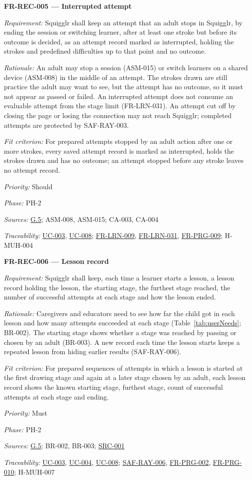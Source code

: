\documentclass[12pt]{article}
\renewcommand{\_}{\textunderscore\allowbreak}%
\newcommand{\goalref}[1]{\hyperref[goal:#1]{G.#1}}
\newcommand{\ucref}[1]{\hyperref[uc:#1]{\mbox{UC-#1}}}
\newenvironment{srsrequirement}[2]{%
  \par\medskip\noindent\phantomsection\label{req:#1}%
  \textbf{#1 --- #2}\par\nobreak\smallskip }{\par\medskip}
\newcommand{\reqfield}[2]{\noindent\textit{#1:} #2\par}
\newcommand{\reqshall}[1]{\reqfield{Requirement}{#1}}
\newcommand{\reqrationale}[1]{\reqfield{Rationale}{#1}}
\newcommand{\reqfit}[1]{\reqfield{Fit criterion}{#1}}
\newcommand{\reqpriority}[1]{\reqfield{Priority}{#1}}
\newcommand{\reqphase}[1]{\reqfield{Phase}{#1}}
\newcommand{\reqsources}[1]{\reqfield{Sources}{#1}}
\newcommand{\reqtraces}[1]{\reqfield{Traceability}{#1}}
\newcommand{\reqref}[1]{\hyperref[req:#1]{#1}}
\newcommand{\srcref}[1]{\hyperref[src:#1]{SRC-#1}}
\providecommand{\ucref}[1]{\hyperref[uc:#1]{UC-#1}}
\begin{document}
\begin{srsrequirement}{FR-REC-005}{Interrupted attempt}
  \reqshall{Squigglr shall keep an attempt that an adult stops in Squigglr, by
ending the session or switching learner, after at least one stroke but before
its outcome is decided, as an attempt record marked as interrupted, holding the
strokes and predefined difficulties up to that point and no outcome.}
\reqrationale{An adult may stop a session (ASM-015) or switch learners on a
shared device (ASM-008) in the middle of an attempt. The strokes drawn are still
practice the adult may want to see, but the attempt has no outcome, so it must
not appear as passed or failed. An interrupted attempt does not consume an
evaluable attempt from the stage limit (FR-LRN-031). An attempt cut off by
closing the page or losing the connection may not reach Squigglr; completed
attempts are protected by SAF-RAY-003.} \reqfit{For prepared attempts stopped by
an adult action after one or more strokes, every saved attempt record is marked
as interrupted, holds the strokes drawn and has no outcome; an attempt stopped
before any stroke leaves no attempt record.}
  \reqpriority{Should}
  \reqphase{PH-2}
  \reqsources{\goalref{5}; ASM-008, ASM-015; CA-003, CA-004}
  \reqtraces{\ucref{003}, \ucref{008}; \reqref{FR-LRN-009}, \reqref{FR-LRN-031}, \reqref{FR-PRG-009};
  H-MUH-004}
\end{srsrequirement}

\begin{srsrequirement}{FR-REC-006}{Lesson record}
  \reqshall{Squigglr shall keep, each time a learner starts a lesson, a lesson
record holding the lesson, the starting stage, the furthest stage reached, the
number of successful attempts at each stage and how the lesson ended.}
\reqrationale{Caregivers and educators need to see how far the child got in each
lesson and how many attempts succeeded at each stage (Table~\ref{tab:userNeeds};
BR-002). The starting stage shows whether a stage was reached by passing or
chosen by an adult (BR-003). A new record each time the lesson starts keeps a
repeated lesson from hiding earlier results (SAF-RAY-006).} \reqfit{For prepared
sequences of attempts in which a lesson is started at the first drawing stage
and again at a later stage chosen by an adult, each lesson record shows the
known starting stage, furthest stage, count of successful attempts at each stage
and ending.}
  \reqpriority{Must}
  \reqphase{PH-2}
  \reqsources{\goalref{5}; BR-002, BR-003; \srcref{001}} \reqtraces{\ucref{003},
  \ucref{004}, \ucref{008}; \reqref{SAF-RAY-006}, \reqref{FR-PRG-002},
  \reqref{FR-PRG-010}; H-MUH-007}
\end{srsrequirement}
\end{document}
